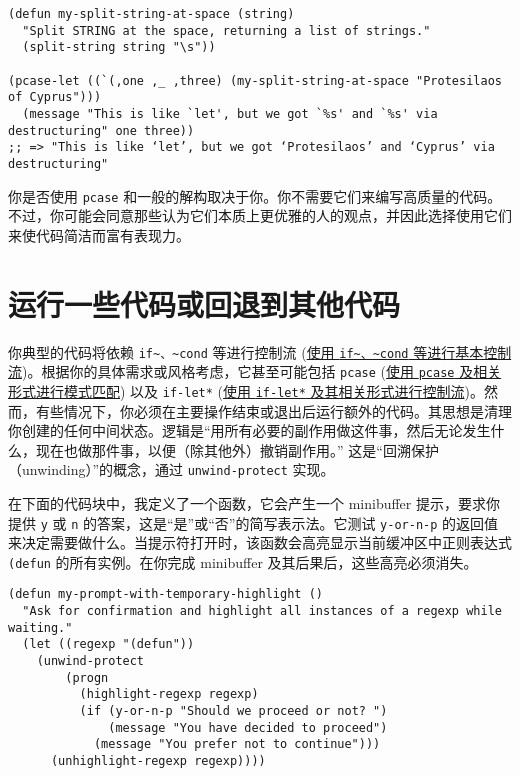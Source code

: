 \documentclass[11pt]{ctexart}
\begin{document}
\begin{verbatim}
(defun my-split-string-at-space (string)
  "Split STRING at the space, returning a list of strings."
  (split-string string "\s"))

(pcase-let ((`(,one ,_ ,three) (my-split-string-at-space "Protesilaos of Cyprus")))
  (message "This is like `let', but we got `%s' and `%s' via destructuring" one three))
;; => "This is like ‘let’, but we got ‘Protesilaos’ and ‘Cyprus’ via destructuring"
\end{verbatim}

你是否使用 \texttt{pcase} 和一般的解构取决于你。你不需要它们来编写高质量的代码。不过，你可能会同意那些认为它们本质上更优雅的人的观点，并因此选择使用它们来使代码简洁而富有表现力。
\section{运行一些代码或回退到其他代码}
\label{sec:org16c56bc}
你典型的代码将依赖 \texttt{if\textasciitilde{}、\textasciitilde{}cond} 等进行控制流 (\hyperref[sec:org9ad3ad6]{使用 \texttt{if\textasciitilde{}、\textasciitilde{}cond} 等进行基本控制流})。根据你的具体需求或风格考虑，它甚至可能包括 \texttt{pcase} (\hyperref[sec:org6c9b23a]{使用 \texttt{pcase} 及相关形式进行模式匹配}) 以及 \texttt{if-let*} (\hyperref[sec:org795b8c4]{使用 \texttt{if-let*} 及其相关形式进行控制流})。然而，有些情况下，你必须在主要操作结束或退出后运行额外的代码。其思想是清理你创建的任何中间状态。逻辑是“用所有必要的副作用做这件事，然后无论发生什么，现在也做那件事，以便（除其他外）撤销副作用。” 这是“回溯保护（unwinding）”的概念，通过 \texttt{unwind-protect} 实现。

在下面的代码块中，我定义了一个函数，它会产生一个 minibuffer 提示，要求你提供 \texttt{y} 或 \texttt{n} 的答案，这是“是”或“否”的简写表示法。它测试 \texttt{y-or-n-p} 的返回值来决定需要做什么。当提示符打开时，该函数会高亮显示当前缓冲区中正则表达式 \texttt{(defun} 的所有实例。在你完成 minibuffer 及其后果后，这些高亮必须消失。

\begin{verbatim}
(defun my-prompt-with-temporary-highlight ()
  "Ask for confirmation and highlight all instances of a regexp while waiting."
  (let ((regexp "(defun"))
    (unwind-protect
        (progn
          (highlight-regexp regexp)
          (if (y-or-n-p "Should we proceed or not? ")
              (message "You have decided to proceed")
            (message "You prefer not to continue")))
      (unhighlight-regexp regexp))))
\end{verbatim}
\end{document}
